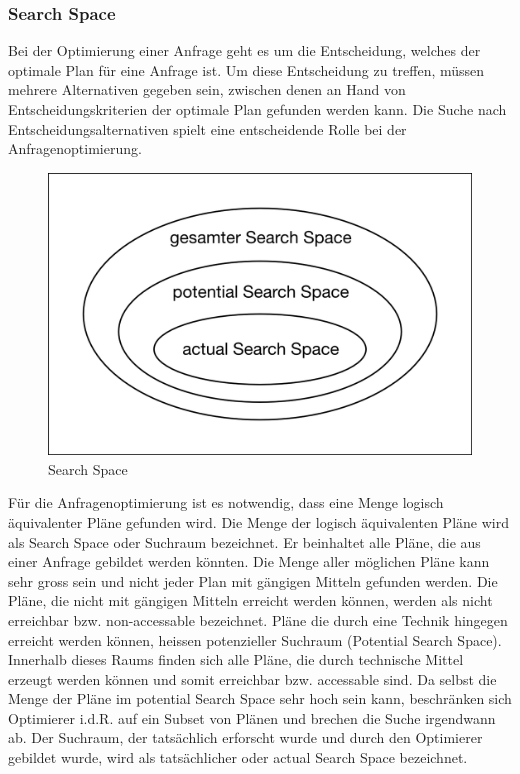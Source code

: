 \subsubsection{Search Space}

Bei der Optimierung einer Anfrage geht es um die Entscheidung, welches der optimale Plan für eine Anfrage ist. Um diese Entscheidung zu treffen, müssen mehrere Alternativen gegeben sein, zwischen denen an Hand von Entscheidungskriterien der optimale Plan gefunden werden kann. Die Suche nach Entscheidungsalternativen spielt eine entscheidende Rolle bei der Anfragenoptimierung.


\begin{figure}[h]
  \centering
  \includegraphics[width=\textwidth]{02_Grundlagen/SearchSpace.png}
  \caption{Search Space}
  \label{SearchSpace}
\end{figure}

Für die Anfragenoptimierung ist es notwendig, dass eine Menge logisch äquivalenter Pläne gefunden wird. Die Menge der logisch äquivalenten Pläne wird als Search Space oder Suchraum bezeichnet. Er beinhaltet alle Pläne, die aus einer Anfrage gebildet werden könnten. Die Menge aller möglichen Pläne kann sehr gross sein und nicht jeder Plan mit gängigen Mitteln gefunden werden. Die Pläne, die nicht mit gängigen Mitteln erreicht werden können, werden als nicht erreichbar bzw. non-accessable bezeichnet. Pläne die durch eine Technik hingegen erreicht werden können, heissen potenzieller Suchraum (Potential Search Space). Innerhalb dieses Raums finden sich alle Pläne, die durch technische Mittel erzeugt werden können und somit erreichbar bzw. accessable sind.  Da selbst die Menge der Pläne im potential Search Space sehr hoch sein kann, beschränken sich Optimierer i.d.R. auf ein Subset von Plänen und brechen die Suche irgendwann ab. Der Suchraum, der tatsächlich erforscht wurde und durch den Optimierer gebildet wurde, wird als tatsächlicher oder actual Search Space bezeichnet.


